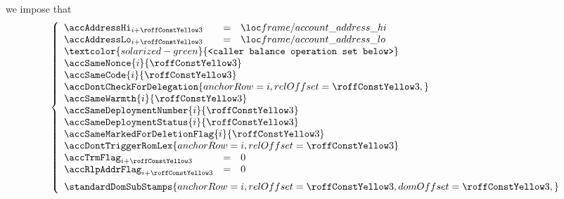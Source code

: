 \item[\underline{\underline{First \callerName{} account-row $n^°(i + \callFirstCallerAccountRowOffset)$:}}]
	we impose that
	\[
		\left\{ \begin{array}{lcl}
			\accAddressHi _{i + \callFirstCallerAccountRowOffset} & = & \locCurrentAccountAddressHi \\
			\accAddressLo _{i + \callFirstCallerAccountRowOffset} & = & \locCurrentAccountAddressLo \\
			\multicolumn{3}{l}{\textcolor{solarized-green}{\texttt{<caller balance operation set below>}}} \\
			\multicolumn{3}{l}{\accSameNonce                     {i}{\callFirstCallerAccountRowOffset}} \\
			\multicolumn{3}{l}{\accSameCode                      {i}{\callFirstCallerAccountRowOffset}} \\
			\multicolumn{3}{l}{\accDontCheckForDelegation {
				anchorRow = i                                ,
				relOffset = \callFirstCallerAccountRowOffset ,
			}} \\
			\multicolumn{3}{l}{\accSameWarmth                    {i}{\callFirstCallerAccountRowOffset}} \\
			\multicolumn{3}{l}{\accSameDeploymentNumber          {i}{\callFirstCallerAccountRowOffset}} \\
			\multicolumn{3}{l}{\accSameDeploymentStatus          {i}{\callFirstCallerAccountRowOffset}} \\
			\multicolumn{3}{l}{\accSameMarkedForDeletionFlag     {i}{\callFirstCallerAccountRowOffset}} \\
			\multicolumn{3}{l}{\accDontTriggerRomLex { anchorRow = i, relOffset = \callFirstCallerAccountRowOffset } } \\
			\accTrmFlag      _{i + \callFirstCallerAccountRowOffset} & = & 0 \\
			\accRlpAddrFlag  _{i + \callFirstCallerAccountRowOffset} & = & 0 \vspace{2mm} \\
			\multicolumn{3}{l}{
				\standardDomSubStamps {
					anchorRow = i                                ,
					relOffset = \callFirstCallerAccountRowOffset ,
					domOffset = \callFirstCallerAccountRowOffset ,
				}
			} \\
		\end{array} \right.
	\]

